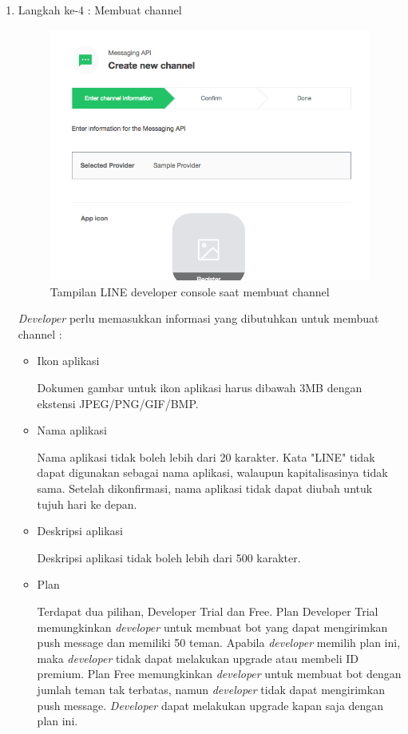 \documentclass[a4paper,twoside]{article}
\begin{document}
\begin{enumerate}
\begin{enumerate}
\begin{enumerate}
\item Langkah ke-4 : Membuat channel
\begin{figure}[H]
	\centering  
	\includegraphics[scale=0.4]{Gambar/line-developers-console-create-channel.png}  
	\caption[Tampilan LINE developer console saat membuat channel]{Tampilan LINE developer console saat membuat channel} 
	\label{fig:line-developers-console-create-channel} 
\end{figure}

\textit{Developer} perlu memasukkan informasi yang dibutuhkan untuk membuat channel :
\begin{itemize}
\item Ikon aplikasi

Dokumen gambar untuk ikon aplikasi harus dibawah 3MB dengan ekstensi JPEG/PNG/GIF/BMP.

\item Nama aplikasi

Nama aplikasi tidak boleh lebih dari 20 karakter. Kata "LINE" tidak dapat digunakan sebagai nama aplikasi, walaupun kapitalisasinya tidak sama. Setelah dikonfirmasi, nama aplikasi tidak dapat diubah untuk tujuh hari ke depan.

\item Deskripsi aplikasi

Deskripsi aplikasi tidak boleh lebih dari 500 karakter.

\item Plan

Terdapat dua pilihan, Developer Trial dan Free. Plan Developer Trial memungkinkan \textit{developer} untuk membuat bot yang dapat mengirimkan push message dan memiliki 50 teman. Apabila \textit{developer} memilih plan ini, maka \textit{developer} tidak dapat melakukan upgrade atau membeli ID premium. Plan Free memungkinkan \textit{developer} untuk membuat bot dengan jumlah teman tak terbatas, namun \textit{developer} tidak dapat mengirimkan push message. \textit{Developer} dapat melakukan upgrade kapan saja dengan plan ini.


\end{itemize}
\end{enumerate}
\end{enumerate}
\end{enumerate}
\end{document}
